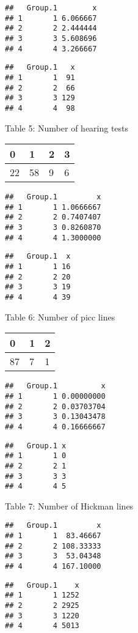 \documentclass[]{article}
\begin{document}
\begin{verbatim}
##   Group.1        x
## 1       1 6.066667
## 2       2 2.444444
## 3       3 5.608696
## 4       4 3.266667
\end{verbatim}

\begin{verbatim}
##   Group.1   x
## 1       1  91
## 2       2  66
## 3       3 129
## 4       4  98
\end{verbatim}

Table 5: Number of hearing tests

\begin{tabular}{l|l|l|l}
\hline
0 & 1 & 2 & 3\\
\hline
22 & 58 & 9 & 6\\
\hline
\end{tabular}

\begin{verbatim}
##   Group.1         x
## 1       1 1.0666667
## 2       2 0.7407407
## 3       3 0.8260870
## 4       4 1.3000000
\end{verbatim}

\begin{verbatim}
##   Group.1  x
## 1       1 16
## 2       2 20
## 3       3 19
## 4       4 39
\end{verbatim}

Table 6: Number of picc lines

\begin{tabular}{l|l|l}
\hline
0 & 1 & 2\\
\hline
87 & 7 & 1\\
\hline
\end{tabular}

\begin{verbatim}
##   Group.1          x
## 1       1 0.00000000
## 2       2 0.03703704
## 3       3 0.13043478
## 4       4 0.16666667
\end{verbatim}

\begin{verbatim}
##   Group.1 x
## 1       1 0
## 2       2 1
## 3       3 3
## 4       4 5
\end{verbatim}

Table 7: Number of Hickman lines

\begin{verbatim}
##   Group.1         x
## 1       1  83.46667
## 2       2 108.33333
## 3       3  53.04348
## 4       4 167.10000
\end{verbatim}

\begin{verbatim}
##   Group.1    x
## 1       1 1252
## 2       2 2925
## 3       3 1220
## 4       4 5013
\end{verbatim}
\end{document}
